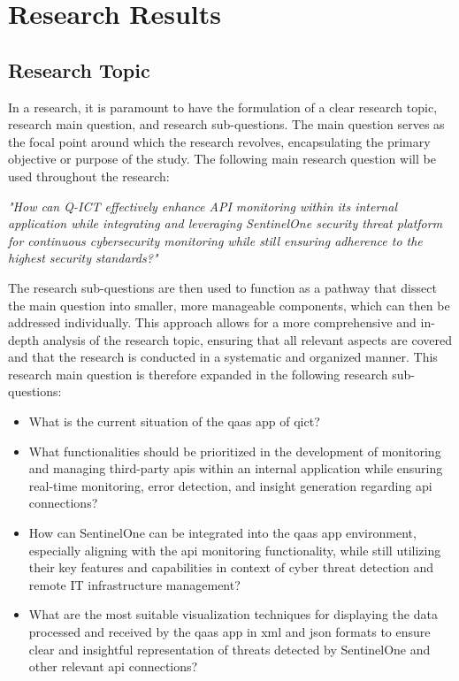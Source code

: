 \chapter{Research Results}
\begin{multicols}{2}
      \section{Research Topic}
      In a research, it is paramount to have the formulation of a clear research topic, research main question,
      and research sub-questions. The main question serves as the focal point around which the research revolves,
      encapsulating the primary objective or purpose of the study.
      The following main research question will be used throughout the research:
      \begin{center}
            \textit{"How can Q-ICT effectively enhance API monitoring within its internal application while
                  integrating and leveraging SentinelOne security threat platform for continuous cybersecurity
                  monitoring while still ensuring adherence to the highest security standards?"}
      \end{center}
      The research sub-questions are then used to function as a pathway that dissect the main
      question into smaller, more manageable components, which can then be addressed individually. This approach
      allows for a more comprehensive and in-depth analysis of the research topic, ensuring that all relevant
      aspects are covered and that the research is conducted in a systematic and organized manner.
      This research main question is therefore expanded in the following research sub-questions:
      \begin{itemize}
            \item What is the current situation of the \acrshort{qaas} app of \acrshort{qict}?
            \item What functionalities should be prioritized in the development of monitoring and managing
                  third-party \acrshort{api}s within an internal application while ensuring real-time monitoring,
                  error detection, and insight generation regarding \acrshort{api} connections?
            \item How can SentinelOne can be integrated into the \acrshort{qaas} app environment, especially
                  aligning with the \acrshort{api} monitoring functionality, while still utilizing their key
                  features and capabilities in context of cyber threat detection and remote IT infrastructure
                  management?
            \item What are the most suitable visualization techniques for displaying the data processed and
                  received by the \acrshort{qaas} app in \acrshort{xml} and \acrshort{json} formats to ensure
                  clear and insightful representation of threats detected by SentinelOne and other relevant
                  \acrshort{api} connections?
      \end{itemize}

\end{multicols}
